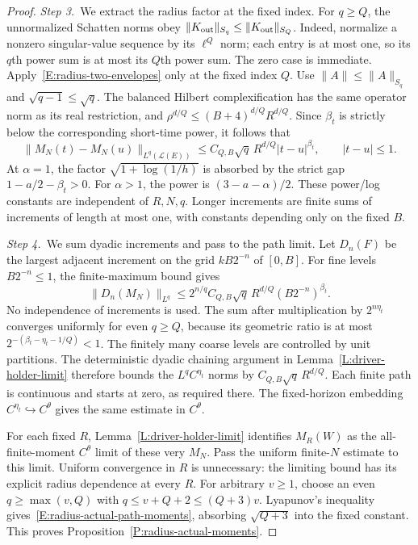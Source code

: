 \begin{proof}
  \medskip
  \noindent\textit{Step 3.~}We extract the radius factor at the fixed index.
  For $q \ge Q$, the unnormalized Schatten norms obey $\|K_{\rm out}\|_{S_q} \le
  \|K_{\rm out}\|_{S_Q}$. Indeed, normalize a nonzero singular-value sequence by
  its $\ell^Q$ norm; each entry is at most one, so its $q$th power sum is at
  most its $Q$th power sum. The zero case is immediate.
  Apply~\eqref{E:radius-two-envelopes} only at the fixed index $Q$. Use $\|A\|
  \le \|A\|_{S_q}$ and $\sqrt{q-1} \le \sqrt q$. The balanced Hilbert
  complexification has the same operator norm as its real restriction, and
  $\rho^{d/Q} \le (B+4)^{d/Q}R^{d/Q}$. Since $\beta_t$ is strictly below the
  corresponding short-time power, it follows that
  \begin{equation}\label{E:radius-finite-increment}
    \|M_N(t)-M_N(u)\|_{L^q(\mathcal{L}(E))}
    \le C_{Q,B}\sqrt q\,R^{d/Q}|t-u|^{\beta_t},
    \qquad |t-u|\le1.
  \end{equation}
  At $\alpha = 1$, the factor $\sqrt{1+\log(1/h)}$ is absorbed by the strict gap
  $1-a/2-\beta_t > 0$. For $\alpha > 1$, the power is $(3-a-\alpha)/2$. These
  power/log constants are independent of $R,N,q$. Longer increments are finite
  sums of increments of length at most one, with constants depending only on the
  fixed $B$.


  \medskip
  \noindent\textit{Step 4.~}We sum dyadic increments and pass to the path
  limit.
  Let $D_n(F)$ be the largest adjacent increment on the grid $kB2^{-n}$ of
  $[0,B]$. For fine levels $B2^{-n} \le 1$, the finite-maximum bound gives
  \[
    \|D_n(M_N)\|_{L^q}
    \le2^{n/q}C_{Q,B}\sqrt q\,R^{d/Q}(B2^{-n})^{\beta_t}.
  \]
  No independence of increments is used. The sum after multiplication by
  $2^{n\eta_t}$ converges uniformly for even $q \ge Q$, because its geometric
  ratio is at most $2^{-(\beta_t-\eta_t-1/Q)} < 1$. The finitely many coarse
  levels are controlled by unit partitions. The deterministic dyadic chaining
  argument in Lemma~\ref{L:driver-holder-limit} therefore bounds the
  $L^qC^{\eta_t}$ norms by $C_{Q,B}\sqrt q\,R^{d/Q}$. Each finite path is
  continuous and starts at zero, as required there. The fixed-horizon embedding
  $C^{\eta_t}\hookrightarrow C^\theta$ gives the same estimate in $C^\theta$.

  For each fixed $R$, Lemma~\ref{L:driver-holder-limit} identifies $M_R(W)$ as
  the all-finite-moment $C^\theta$ limit of these very $M_N$. Pass the uniform
  finite-$N$ estimate to this limit. Uniform convergence in $R$ is unnecessary:
  the limiting bound has its explicit radius dependence at every $R$. For
  arbitrary $v \ge 1$, choose an even $q \ge \max(v,Q)$ with $q \le v+Q+2 \le
  (Q+3)v$. Lyapunov's inequality gives~\eqref{E:radius-actual-path-moments},
  absorbing $\sqrt{Q+3}$ into the fixed constant. This proves
  Proposition~\ref{P:radius-actual-moments}.
\end{proof}

